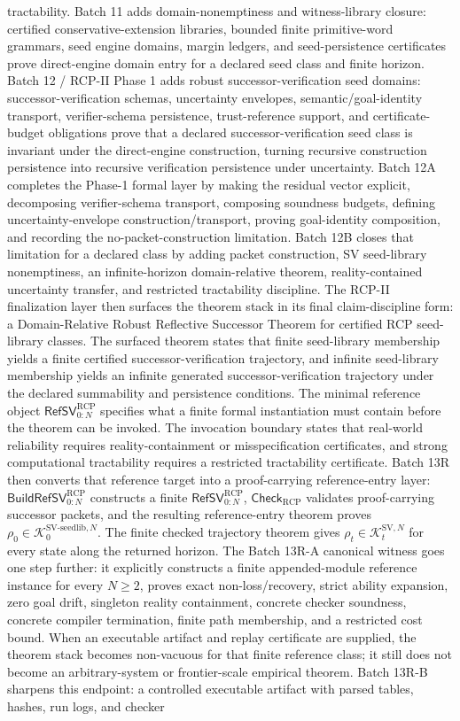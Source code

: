 \documentclass[11pt]{article}
\newcommand{\1}{\mathbf{1}}
\newcommand{\RCP}{\mathrm{RCP}}
\providecommand{\Kcal}{\mathcal{K}}
\begin{document}
tractability. Batch 11 adds domain-nonemptiness and witness-library closure: certified conservative-extension libraries, bounded finite primitive-word grammars, seed engine domains, margin ledgers, and seed-persistence certificates prove direct-engine domain entry for a declared seed class and finite horizon. Batch 12 / RCP-II Phase 1 adds robust successor-verification seed domains: successor-verification schemas, uncertainty envelopes, semantic/goal-identity transport, verifier-schema persistence, trust-reference support, and certificate-budget obligations prove that a declared successor-verification seed class is invariant under the direct-engine construction, turning recursive construction persistence into recursive verification persistence under uncertainty. Batch 12A completes the Phase-1 formal layer by making the residual vector explicit, decomposing verifier-schema transport, composing soundness budgets, defining uncertainty-envelope construction/transport, proving goal-identity composition, and recording the no-packet-construction limitation. Batch 12B closes that limitation for a declared class by adding packet construction, SV seed-library nonemptiness, an infinite-horizon domain-relative theorem, reality-contained uncertainty transfer, and restricted tractability discipline. The RCP-II finalization layer then surfaces the theorem stack in its final claim-discipline form: a Domain-Relative Robust Reflective Successor Theorem for certified RCP seed-library classes. The surfaced theorem states that finite seed-library membership yields a finite certified successor-verification trajectory, and infinite seed-library membership yields an infinite generated successor-verification trajectory under the declared summability and persistence conditions. The minimal reference object \(\mathsf{RefSV}_{0:N}^{\RCP}\) specifies what a finite formal instantiation must contain before the theorem can be invoked. The invocation boundary states that real-world reliability requires reality-containment or misspecification certificates, and strong computational tractability requires a restricted tractability certificate. Batch 13R then converts that reference target into a proof-carrying reference-entry layer: \(\mathsf{BuildRefSV}_{0:N}^{\RCP}\) constructs a finite \(\mathsf{RefSV}_{0:N}^{\RCP}\), \(\mathsf{Check}_{\RCP}\) validates proof-carrying successor packets, and the resulting reference-entry theorem proves \(\rho_0\in\Kcal_0^{\mathrm{SV\mbox{-}seedlib},N}\).  The finite checked trajectory theorem gives \(\rho_t\in\Kcal_t^{\mathrm{SV},N}\) for every state along the returned horizon.  The Batch 13R-A canonical witness goes one step further: it explicitly constructs a finite appended-module reference instance for every \(N\ge2\), proves exact non-loss/recovery, strict ability expansion, zero goal drift, singleton reality containment, concrete checker soundness, concrete compiler termination, finite path membership, and a restricted cost bound.  When an executable artifact and replay certificate are supplied, the theorem stack becomes non-vacuous for that finite reference class; it still does not become an arbitrary-system or frontier-scale empirical theorem. Batch 13R-B sharpens this endpoint: a controlled executable artifact with parsed tables, hashes, run logs, and checker 
\end{document}
